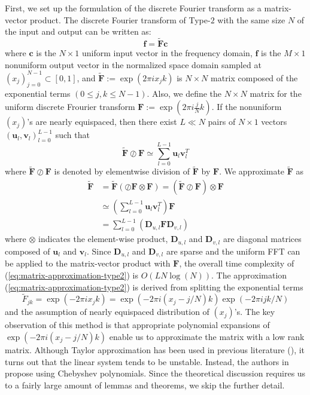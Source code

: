 First, we set up the formulation of the discrete Fourier transform as a matrix-vector product.
The discrete Fourier transform of Type-$2$ with the same size $N$ of the input and output can be written as:
\begin{equation}
  \bm{f} = \tilde{\bm{F}}\bm{c}
  \label{eq:matrix-vector-product-nufft-type-2}
\end{equation}
where
$\bm{c}$ is the $N \times 1$ uniform input vector in the frequency domain,
$\bm{f}$ is the $M \times 1$ nonuniform output vector in the normalized space domain sampled at $(x_j)_{j=0}^{N-1} \subset [0, 1]$, and
$\tilde{\bm{F}} := \exp(2\pi i x_{j}k)$ is $N \times N$ matrix composed of the exponential terms
$(0 \le j, k \le N-1)$.
Also, we define the $N \times N$ matrix for the uniform discrete Frourier transform
$\bm{F} := \exp(2\pi i \frac{j}{N}k)$.
If the nonuniform $(x_j)$'s are nearly equispaced, then there exist $L \ll N$ pairs of $N \times 1$
vectors $(\bm{u}_l, \bm{v}_l)_{l=0}^{L-1}$ such that
\begin{equation}
  \bm{\tilde{F}}\oslash\bm{F} \simeq
  \sum_{l=0}^{L-1}\bm{u}_{l}\bm{v}_{l}^{T}
\end{equation}
where $\tilde{\bm{F}}\oslash\bm{F}$ is denoted by elementwise division of $\tilde{\bm{F}}$ by $\bm{F}$.
We approximate $\bm{\tilde{F}}$ as
\begin{align}
     \tilde{\bm{F}}
  &= \tilde{\bm{F}}\left(\oslash\bm{F}\otimes\bm{F}\right)
   = \left(\tilde{\bm{F}}\oslash\bm{F}\right)\otimes\bm{F} \\
  &\simeq \left(\sum_{l=0}^{L-1}\bm{u}_{l}\bm{v}_{l}^{T}\right)\bm{F} \\
  &= \sum_{l=0}^{L-1}\left(\bm{D}_{u,l}\bm{F}\bm{D}_{v,l}\right)
  \label{eq:matrix-approximation-type2}
\end{align}
where $\otimes$ indicates the element-wise product,
$\bm{D}_{u,l}$ and $\bm{D}_{v,l}$ are diagonal matrices composed of $\bm{u}_{l}$ and $\bm{v}_{l}$.
Since $\bm{D}_{u,l}$ and $\bm{D}_{v,l}$ are sparse and the uniform FFT can be applied to the matrix-vector product with $\bm{F}$, the overall time complexity of (\ref{eq:matrix-approximation-type2})
is $O(L N \log(N))$.
The approximation (\ref{eq:matrix-approximation-type2}) is derived from splitting the exponential terms
\begin{equation}
    \tilde{F}_{jk} = \exp(-2\pi i x_j k)
  = \exp(-2\pi i (x_j - j/N)k)\exp(-2\pi i jk/N)
\end{equation}
and the assumption of nearly equispaced distribution of $(x_j)$'s.
The key observation of this method is that appropriate polynomial expansions of $\exp(-2\pi i (x_j - j/N)k)$ enable us to approximate the matrix with a low rank matrix.
Although Taylor approximation has been used in previous literature (\cite{SISC-1996-Anderson}),
it turns out that the linear system tends to be unstable.
Instead, the authors in \cite{SISC-2018-Townsend} propose using Chebyshev polynomials.
Since the theoretical discussion requires us to a fairly large amount of lemmas and theorems, we skip the further detail.

